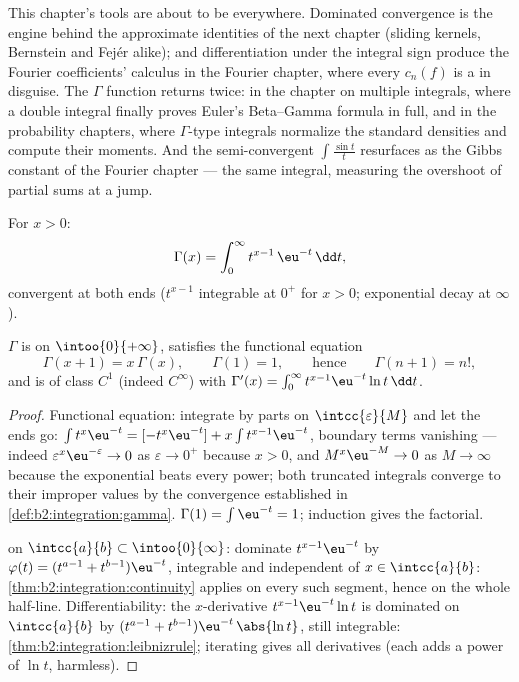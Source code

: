 \begin{remark}
This chapter's tools are about to be everywhere. Dominated
convergence is the engine behind the approximate identities of
the next chapter (sliding kernels, Bernstein and Fej\'er
alike);  and differentiation under the integral sign
produce the Fourier coefficients' calculus in the Fourier
chapter, where every $c_n(f)$ is a  in
disguise. The $\Gamma$ function returns twice: in the chapter
on multiple integrals, where a double integral finally proves
Euler's Beta--Gamma formula in full, and in the probability
chapters, where $\Gamma$-type integrals normalize the standard
densities and compute their moments. And the semi-convergent
$\int\frac{\sin t}{t}$ resurfaces as the Gibbs constant of the
Fourier chapter --- the same integral, measuring the overshoot
of partial sums at a jump.
\end{remark}

\begin{definition}\label{def:b2:integration:gamma}
For $x > 0$:
\[
\Gamma(x) = \int_0^{\infty} t^{x-1}\,\eu^{-t}\,\dd t ,
\]
convergent at both ends ($t^{x-1}$ integrable at $0^+$ for $x > 0$;
exponential decay at $\infty$).
\end{definition}

\begin{theorem}\label{thm:b2:integration:gammaprops}
$\Gamma$ is  on $\intoo{0}{+\infty}$, satisfies the
functional equation
\[
\Gamma(x + 1) = x\,\Gamma(x),
\qquad \Gamma(1) = 1,
\qquad\text{hence}\qquad \Gamma(n + 1) = n! ,
\]
and is of class $C^1$ (indeed $C^\infty$) with $\Gamma'(x) =
\int_0^\infty t^{x-1}\eu^{-t}\ln t\,\dd t$.
\end{theorem}

\begin{proof}
Functional equation: integrate by parts on $\intcc{\varepsilon}{M}$
and let the ends go: $\int t^{x}\eu^{-t} = [-t^x\eu^{-t}] + x\int
t^{x-1}\eu^{-t}$, boundary terms vanishing --- indeed
$\varepsilon^x\eu^{-\varepsilon} \to 0$ as $\varepsilon \to
0^+$ because $x > 0$, and $M^x\eu^{-M} \to 0$ as $M \to \infty$
because the exponential beats every power; both truncated
integrals converge to their improper values by the convergence
established in \cref{def:b2:integration:gamma}. $\Gamma(1) = \int
\eu^{-t} = 1$; induction gives the factorial.

 on $\intcc{a}{b} \subset \intoo{0}{\infty}$: dominate
$t^{x-1}\eu^{-t}$ by $\varphi(t) = (t^{a-1} + t^{b-1})\eu^{-t}$,
integrable and independent of $x \in \intcc{a}{b}$:
\cref{thm:b2:integration:continuity} applies on every such segment,
hence on the whole half-line. Differentiability: the $x$-derivative
$t^{x-1}\eu^{-t}\ln t$ is dominated on $\intcc{a}{b}$ by $(t^{a-1}
+ t^{b-1})\eu^{-t}\,\abs{\ln t}$, still integrable:
\cref{thm:b2:integration:leibnizrule}; iterating gives all
derivatives (each adds a power of $\ln t$, harmless).
\end{proof}

